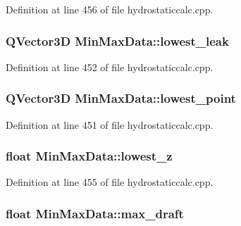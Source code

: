 Definition at line 456 of file hydrostaticcalc.\+cpp.

\subsubsection[{\texorpdfstring{lowest\+\_\+leak}{lowest_leak}}]{\setlength{\rightskip}{0pt plus 5cm}Q\+Vector3D Min\+Max\+Data\+::lowest\+\_\+leak}\hypertarget{structMinMaxData_ab422a9e59c6bb2bc9a28bbb002d5b09f}{}\label{structMinMaxData_ab422a9e59c6bb2bc9a28bbb002d5b09f}


Definition at line 452 of file hydrostaticcalc.\+cpp.

\subsubsection[{\texorpdfstring{lowest\+\_\+point}{lowest_point}}]{\setlength{\rightskip}{0pt plus 5cm}Q\+Vector3D Min\+Max\+Data\+::lowest\+\_\+point}\hypertarget{structMinMaxData_a3d27ad5adf37db4728e700f914bc2ab3}{}\label{structMinMaxData_a3d27ad5adf37db4728e700f914bc2ab3}


Definition at line 451 of file hydrostaticcalc.\+cpp.

\subsubsection[{\texorpdfstring{lowest\+\_\+z}{lowest_z}}]{\setlength{\rightskip}{0pt plus 5cm}float Min\+Max\+Data\+::lowest\+\_\+z}\hypertarget{structMinMaxData_abe1d706394e9836f49ef8cb5dff7bd99}{}\label{structMinMaxData_abe1d706394e9836f49ef8cb5dff7bd99}


Definition at line 455 of file hydrostaticcalc.\+cpp.

\subsubsection[{\texorpdfstring{max\+\_\+draft}{max_draft}}]{\setlength{\rightskip}{0pt plus 5cm}float Min\+Max\+Data\+::max\+\_\+draft}\hypertarget{structMinMaxData_a10cf6d95b5b6d24b6b2e874e9fb05362}{}\label{structMinMaxData_a10cf6d95b5b6d24b6b2e874e9fb05362}


